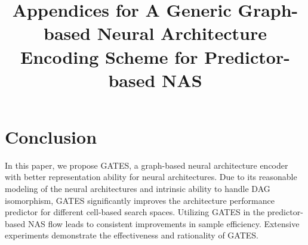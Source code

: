 \documentclass[runningheads]{llncs}
\begin{document}
\section{Conclusion}
\label{sec:conclusion}
In this paper, we propose GATES, a graph-based neural architecture encoder with better representation ability for neural architectures. Due to its reasonable modeling of the neural architectures and intrinsic ability to handle DAG isomorphism, GATES significantly improves the architecture performance predictor for different cell-based search spaces. Utilizing GATES in the predictor-based NAS flow leads to consistent improvements in sample efficiency. Extensive experiments demonstrate the effectiveness and rationality of GATES. 

\clearpage

%
%



\pagestyle{headings}

\title{Appendices for A Generic Graph-based Neural Architecture Encoding Scheme for Predictor-based NAS}
\author{}
\institute{}


\maketitle
\end{document}

